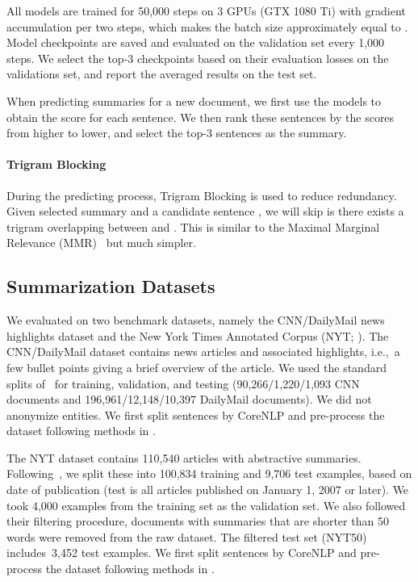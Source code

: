 \documentclass[11pt,a4paper]{article}
\begin{document}
    
    
    All models are trained for 50,000 steps on 3 GPUs (GTX 1080 Ti) with gradient accumulation per two steps, which makes the batch size approximately equal to .
    Model checkpoints are saved and evaluated on the validation set every 1,000 steps. We select the top-3 checkpoints based on their evaluation losses on the validations set, and report the averaged results on the test set.
    
    When predicting summaries for a new document, we first use the  models to obtain the score for each sentence.
    We then rank these sentences by the scores from higher to lower, and select the top-3 sentences as the summary.
    
    \paragraph{Trigram Blocking} 
    During the predicting process, Trigram Blocking is used to reduce redundancy.
    Given selected summary  and a candidate sentence , we will skip  is there exists a trigram overlapping between  and . This is similar to the Maximal Marginal Relevance (MMR)~\cite{carbonell1998use}  but much simpler.
    
    
    \subsection{Summarization Datasets}
    We evaluated  on two benchmark datasets, namely the
    CNN/DailyMail news highlights dataset \cite{hermann2015teaching} and
    the New York Times Annotated Corpus (NYT; \citealt{nytcorpus}).
    The CNN/DailyMail dataset contains news articles and associated
    highlights, i.e.,~a few bullet points giving a brief overview of the
    article.  We used the standard splits of~\citet{hermann2015teaching}
    for training, validation, and testing (90,266/1,220/1,093 CNN
    documents and 196,961/12,148/10,397 DailyMail documents). We did not
    anonymize entities.
    We first split sentences by CoreNLP and pre-process the dataset following methods in \citet{see-acl17}.

    
    
    The NYT dataset contains 110,540 articles with abstractive
    summaries. Following~\citet{durrett2016learning}, we split these into
    100,834 training and 9,706 test examples, based on date of publication
    (test is all articles published on January 1, 2007 or later).  
    We took 4,000 examples from the training set as the validation set.
    We also
    followed their filtering procedure, documents  with summaries that
    are shorter than 50 words were removed from the raw dataset.  The
    filtered test set (NYT50) includes~3,452 test examples.
        We first split sentences by CoreNLP and pre-process the dataset following methods in \citet{durrett2016learning}.
    
\end{document}
